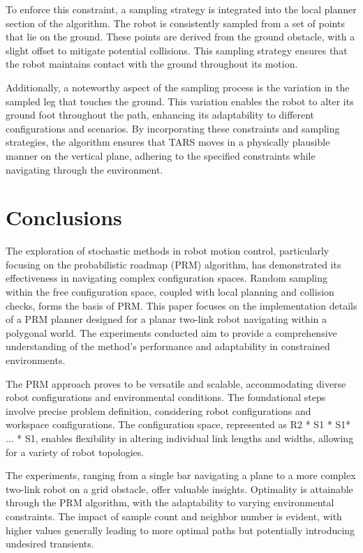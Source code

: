 \documentclass{IEEEtaes}
\begin{document}
To enforce this constraint, a sampling strategy is integrated into the local planner section of the algorithm. The robot is consistently sampled from a set of points that lie on the ground. These points are derived from the ground obstacle, with a slight offset to mitigate potential collisions. This sampling strategy ensures that the robot maintains contact with the ground throughout its motion.

Additionally, a noteworthy aspect of the sampling process is the variation in the sampled leg that touches the ground. This variation enables the robot to alter its ground foot throughout the path, enhancing its adaptability to different configurations and scenarios. By incorporating these constraints and sampling strategies, the algorithm ensures that TARS moves in a physically plausible manner on the vertical plane, adhering to the specified constraints while navigating through the environment.


\section{\large \textbf{Conclusions}}
The exploration of stochastic methods in robot motion control, particularly focusing on the probabilistic roadmap (PRM) algorithm, has demonstrated its effectiveness in navigating complex configuration spaces. Random sampling within the free configuration space, coupled with local planning and collision checks, forms the basis of PRM. This paper focuses on the implementation details of a PRM planner designed for a planar two-link robot navigating within a polygonal world. The experiments conducted aim to provide a comprehensive understanding of the method's performance and adaptability in constrained environments.

The PRM approach proves to be versatile and scalable, accommodating diverse robot configurations and environmental conditions. The foundational steps involve precise problem definition, considering robot configurations and workspace configurations. The configuration space, represented as R2 * S1 * S1* ... * S1, enables flexibility in altering individual link lengths and widths, allowing for a variety of robot topologies.

The experiments, ranging from a single bar navigating a plane to a more complex two-link robot on a grid obstacle, offer valuable insights. Optimality is attainable through the PRM algorithm, with the adaptability to varying environmental constraints. The impact of sample count and neighbor number is evident, with higher values generally leading to more optimal paths but potentially introducing undesired transients.
\end{document}

